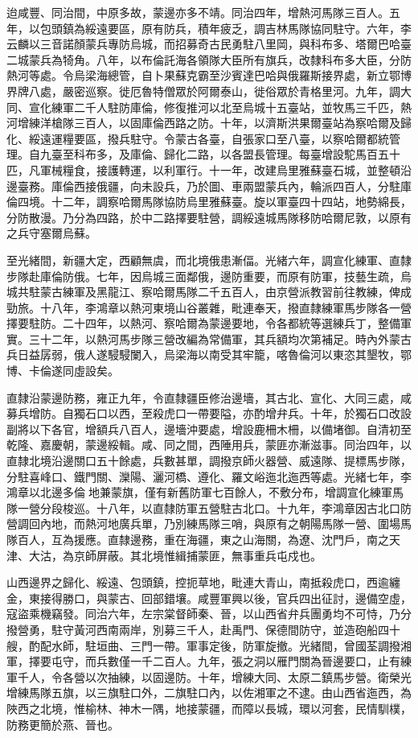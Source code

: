 \begin{pinyinscope}
迨咸豐、同治間，中原多故，蒙邊亦多不靖。同治四年，增熱河馬隊三百人。五年，以包頭鎮為綏遠要區，原有防兵，積年疲乏，調吉林馬隊協同駐守。六年，李云麟以三音諾顏蒙兵專防烏城，而招募奇古民勇駐八里岡，與科布多、塔爾巴哈臺二城蒙兵為犄角。八年，以布倫託海各領隊大臣所有旗兵，改隸科布多大臣，分防熱河等處。令烏梁海總管，自卜果蘇克霸至沙賓達巴哈與俄羅斯接界處，新立鄂博界牌八處，嚴密巡察。徙厄魯特僧眾於阿爾泰山，徙俗眾於青格里河。九年，調大同、宣化練軍二千人駐防庫倫，修復推河以北至烏城十五臺站，並牧馬三千匹，熱河增練洋槍隊三百人，以固庫倫西路之防。十年，以濟斯洪果爾臺站為察哈爾及歸化、綏遠運糧要區，撥兵駐守。令蒙古各臺，自張家口至八臺，以察哈爾都統管理。自九臺至科布多，及庫倫、歸化二路，以各盟長管理。每臺增設駝馬百五十匹，凡軍械糧食，接護轉運，以利軍行。十一年，改建烏里雅蘇臺石城，並整頓沿邊臺務。庫倫西接俄疆，向未設兵，乃於圖、車兩盟蒙兵內，輪派四百人，分駐庫倫四境。十二年，調察哈爾馬隊協防烏里雅蘇臺。旋以軍臺四十四站，地勢綿長，分防散漫。乃分為四路，於中二路擇要駐營，調綏遠城馬隊移防哈爾尼敦，以原有之兵守塞爾烏蘇。

至光緒間，新疆大定，西顧無虞，而北境俄患漸偪。光緒六年，調宣化練軍、直隸步隊赴庫倫防俄。七年，因烏城三面鄰俄，邊防重要，而原有防軍，技藝生疏，烏城共駐蒙古練軍及黑龍江、察哈爾馬隊二千五百人，由京營派教習前往教練，俾成勁旅。十八年，李鴻章以熱河東境山谷叢雜，毗連奉天，撥直隸練軍馬步隊各一營擇要駐防。二十四年，以熱河、察哈爾為蒙邊要地，令各都統等選練兵丁，整備軍實。三十二年，以熱河馬步隊三營改編為常備軍，其兵額均次第補足。時內外蒙古兵日益孱弱，俄人遂駸駸闌入，烏梁海以南受其牢籠，喀魯倫河以東恣其墾牧，鄂博、卡倫遂同虛設矣。

直隸沿蒙邊防務，雍正九年，令直隸疆臣修治邊墻，其古北、宣化、大同三處，咸募兵增防。自獨石口以西，至殺虎口一帶要隘，亦酌增弁兵。十年，於獨石口改設副將以下各官，增額兵八百人，邊墻沖要處，增設鹿柵木柵，以備堵御。自清初至乾隆、嘉慶朝，蒙邊綏輯。咸、同之間，西陲用兵，蒙匪亦漸滋事。同治四年，以直隸北境沿邊關口五十餘處，兵數甚單，調撥京師火器營、威遠隊、提標馬步隊，分駐喜峰口、鐵門關、灤陽、灑河橋、遵化、羅文峪迤北迤西等處。光緒七年，李鴻章以北邊多倫地兼蒙旗，僅有新舊防軍七百餘人，不敷分布，增調宣化練軍馬隊一營分段梭巡。十八年，以直隸防軍五營駐古北口。十九年，李鴻章因古北口防營調回內地，而熱河地廣兵單，乃別練馬隊三哨，與原有之朝陽馬隊一營、圍場馬隊百人，互為援應。直隸邊務，重在海疆，東之山海關，為遼、沈門戶，南之天津、大沽，為京師屏蔽。其北境惟緝捕蒙匪，無事重兵屯戍也。

山西邊界之歸化、綏遠、包頭鎮，控扼草地，毗連大青山，南抵殺虎口，西逾纏金，東接得勝口，與蒙古、回部錯壤。咸豐軍興以後，官兵四出征討，邊備空虛，寇盜乘機竊發。同治六年，左宗棠督師秦、晉，以山西省弁兵團勇均不可恃，乃分撥營勇，駐守黃河西南兩岸，別募三千人，赴禹門、保德間防守，並造砲船四十艘，酌配水師，駐垣曲、三門一帶。軍事定後，防軍旋撤。光緒間，曾國荃調撥湘軍，擇要屯守，而兵數僅一千二百人。九年，張之洞以雁門關為晉邊要口，止有練軍千人，令各營以次抽練，以固邊防。十年，增練大同、太原二鎮馬步營。衛榮光增練馬隊五旗，以三旗駐口外，二旗駐口內，以佐湘軍之不逮。由山西省迤西，為陜西之北境，惟榆林、神木一隅，地接蒙疆，而障以長城，環以河套，民情馴樸，防務更簡於燕、晉也。


\end{pinyinscope}
